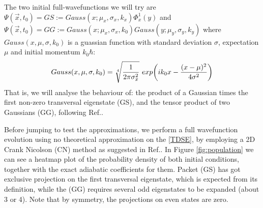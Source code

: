 \documentclass[11pt, a4paper]{article} %
\begin{document}
The two initial full-wavefunctions we will try are $\Psi(\vec{x},t_0)=GS:=Gauss(x;\mu_x, \sigma_x, k_x)\Phi^1_x(y)$ and $\Psi(\vec{x},t_0)=GG:=Gauss(x; \mu_x, \sigma_x, k_0)Gauss(y; \mu_y, \sigma_y, k_y)$ where $Gauss(x,\mu, \sigma, k_0)$ is a guassian function with standard deviation $\sigma$, expectation $\mu$ and initial momentum $k_0\hbar$:
$$
Gauss(x,\mu,\sigma,k_0)=\sqrt[4]{\frac{1}{2\pi \sigma_x^2}}\ exp\qty(ik_0x-\frac{(x-\mu)^2}{4\sigma^2})
$$
That is, we will analyse the behaviour of: the product of a Gaussian times the first non-zero transversal eigenstate (GS), and the tensor product of two Gaussians (GG), following Ref.\cite{Dev}. 

Before jumping to test the approximations, we perform a full wavefunction evolution using no theoretical approximation on the \ref{TDSE}, by employing a 2D Crank Nicolson (CN) method as suggested in Ref.\cite{nireTFGie}. In Figure \ref{fig:population} we can see a heatmap plot of the probability density of both initial conditions, together with the exact adiabatic coefficients for them. Packet (GS) has got exclusive projection on the first transversal eigenstate, which is expected from its definition, while the (GG) requires several odd eigenstates to be expanded (about 3 or 4). Note that by symmetry, the projections on even states are zero.\vspace{-0.3cm}
\end{document}
